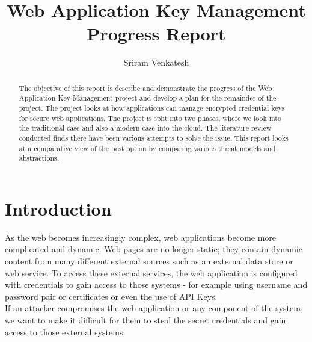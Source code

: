 \documentclass[11pt, a4paper, twoside, notitlepage]{article}
\title{Web Application Key Management Progress Report}
\author{Sriram Venkatesh}
\date{}
\begin{document}
\frontmatter


\begin{abstract}
The objective of this report is describe and demonstrate the progress of the Web Application Key Management project and develop a plan for the remainder of the project. The project looks at how applications can manage encrypted credential keys for secure web applications. The project is split into two phases, where we look into the traditional case and also a modern case into the cloud. The literature review conducted finds there have been various attempts to solve the issue. This report looks at a comparative view of the best option by comparing various threat models and abstractions. 
\end{abstract}


\maketitle




\mainmatter


\section{Introduction}
As the web becomes increasingly complex, web applications become more complicated and dynamic. Web pages are no longer static; they contain dynamic content from many different external sources such as an external data store or web service. To access these external services, the web application is configured with credentials to gain access to those systems - for example using username and password pair or certificates or even the use of API Keys. \\

If an attacker compromises the web application or any component of the system, we want to make it difficult for them to steal the secret credentials and gain access to those external systems. \\
\end{document}
